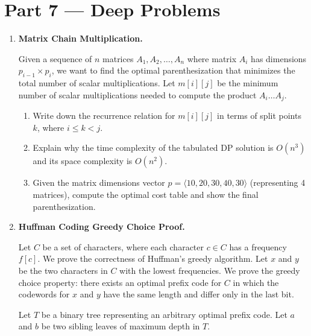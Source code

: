 \documentclass[12pt, a4paper]{book}
\begin{document}
\newpage

\section{Part 7 --- Deep Problems}

\begin{deepbox}
\begin{enumerate}[label=\textbf{D\arabic*.}]
  \item \textbf{Matrix Chain Multiplication.}
  
        Given a sequence of $n$ matrices $A_1, A_2, \dots, A_n$ where matrix $A_i$ has dimensions $p_{i-1} \times p_i$, we want to find the optimal parenthesization that minimizes the total number of scalar multiplications.
        Let $m[i][j]$ be the minimum number of scalar multiplications needed to compute the product $A_i \dots A_j$.
        
        \begin{enumerate}[label=(\alph*)]
          \item Write down the recurrence relation for $m[i][j]$ in terms of split points $k$, where $i \le k < j$.
          \item Explain why the time complexity of the tabulated DP solution is $O(n^3)$ and its space complexity is $O(n^2)$.
          \item Given the matrix dimensions vector $p = \langle 10, 20, 30, 40, 30 \rangle$ (representing 4 matrices), compute the optimal cost table and show the final parenthesization.
        \end{enumerate}

  \item \textbf{Huffman Coding Greedy Choice Proof.}
  
        Let $C$ be a set of characters, where each character $c \in C$ has a frequency $f[c]$.
        We prove the correctness of Huffman's greedy algorithm.
        Let $x$ and $y$ be the two characters in $C$ with the lowest frequencies.
        We prove the greedy choice property: there exists an optimal prefix code for $C$ in which the codewords for $x$ and $y$ have the same length and differ only in the last bit.
        
        Let $T$ be a binary tree representing an arbitrary optimal prefix code.
        Let $a$ and $b$ be two sibling leaves of maximum depth in $T$.
        

\end{enumerate}
\end{deepbox}
\end{document}
